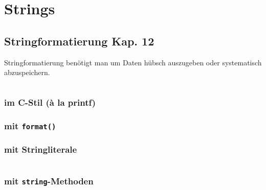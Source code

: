 \section{Strings}

\subsection[Stringformatierung]{Stringformatierung \tiny{Kap. 12}}
Stringformatierung benötigt man um Daten hübsch auszugeben oder systematisch abzuspeichern.\\
\begin{minipage}[t]{0.49\textwidth}
	
\end{minipage}
\begin{minipage}[t]{0.02\textwidth} $ \quad $ \end{minipage}
\begin{minipage}[t]{0.49\textwidth}
	
\end{minipage}

\subsubsection{im C-Stil (à la printf)}


\subsubsection{mit \texttt{format()}}


\begin{minipage}[t]{0.49\textwidth}
	\subsubsection{mit Stringliterale}
	
\end{minipage}
\begin{minipage}[t]{0.02\textwidth} $ \quad $ \end{minipage}
\begin{minipage}[t]{0.49\textwidth}
	\subsubsection{mit \texttt{string}-Methoden}
		
\end{minipage}

